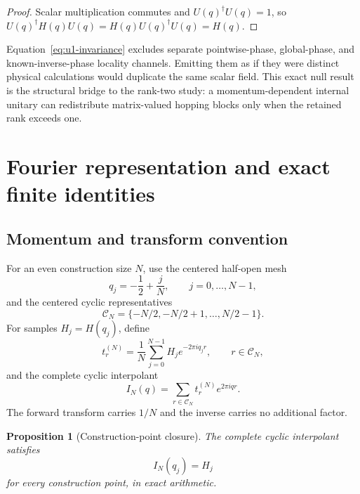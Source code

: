 \documentclass[11pt]{article}
\newtheorem{proposition}{Proposition}
\begin{document}
\begin{proof}
Scalar multiplication commutes and $U(q)^{\dagger}U(q)=1$, so
$U(q)^{\dagger}H(q)U(q)=H(q)U(q)^{\dagger}U(q)=H(q)$.
\end{proof}

Equation~\eqref{eq:u1-invariance} excludes separate pointwise-phase, global-phase, and
known-inverse-phase locality channels.  Emitting them as if they were distinct physical
calculations would duplicate the same scalar field.  This exact null result is the
structural bridge to the rank-two study: a momentum-dependent internal unitary can
redistribute matrix-valued hopping blocks only when the retained rank exceeds one.

\section{Fourier representation and exact finite identities}

\subsection{Momentum and transform convention}

For an even construction size $N$, use the centered half-open mesh
\begin{equation}
 q_j=-\frac12+\frac{j}{N},\qquad j=0,\ldots,N-1,
\end{equation}
and the centered cyclic representatives
\begin{equation}
 \mathcal C_N=\{-N/2,-N/2+1,\ldots,N/2-1\}.
\end{equation}
For samples $H_j=H(q_j)$, define
\begin{equation}
 t_r^{(N)}=\frac1N\sum_{j=0}^{N-1}H_j e^{-2\pi i q_jr},
 \qquad r\in\mathcal C_N,
 \label{eq:forward-transform}
\end{equation}
and the complete cyclic interpolant
\begin{equation}
 I_N(q)=\sum_{r\in\mathcal C_N}t_r^{(N)}e^{2\pi iqr}.
 \label{eq:complete-interpolant}
\end{equation}
The forward transform carries $1/N$ and the inverse carries no additional factor.

\begin{proposition}[Construction-point closure]
The complete cyclic interpolant satisfies
\begin{equation}
 I_N(q_j)=H_j
\end{equation}
for every construction point, in exact arithmetic.
\end{proposition}
\end{document}
